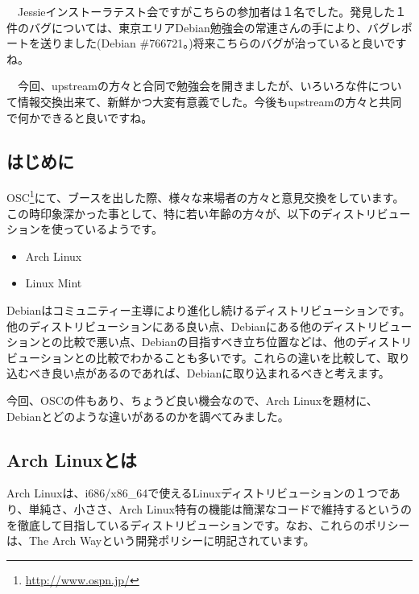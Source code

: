 \documentclass[mingoth,a4paper]{jsarticle}
\begin{document}
　Jessieインストーラテスト会ですがこちらの参加者は１名でした。発見した１件のバグについては、東京エリアDebian勉強会の常連さんの手により、バグレポートを送りました(Debian \#766721。)将来こちらのバグが治っていると良いですね。

　今回、upstreamの方々と合同で勉強会を開きましたが、いろいろな件について情報交換出来て、新鮮かつ大変有意義でした。今後もupstreamの方々と共同で何かできると良いですね。



\subsection{はじめに}

 OSC\footnote{\url{http://www.ospn.jp/}}にて、ブースを出した際、様々な来場者の方々と意見交換をしています。この時印象深かった事として、特に若い年齢の方々が、以下のディストリビューションを使っているようです。

 \begin{itemize}
 \item Arch Linux
 \item Linux Mint
 \end{itemize}
 
 Debianはコミュニティー主導により進化し続けるディストリビューションです。他のディストリビューションにある良い点、Debianにある他のディストリビューションとの比較で悪い点、Debianの目指すべき立ち位置などは、他のディストリビューションとの比較でわかることも多いです。これらの違いを比較して、取り込むべき良い点があるのであれば、Debianに取り込まれるべきと考えます。

 今回、OSCの件もあり、ちょうど良い機会なので、Arch Linuxを題材に、Debianとどのような違いがあるのかを調べてみました。

\subsection{Arch Linuxとは}

 Arch Linuxは、i686/x86\_64で使えるLinuxディストリビューションの１つであり、単純さ、小ささ、Arch Linux特有の機能は簡潔なコードで維持するというのを徹底して目指しているディストリビューションです\cite{ref:arch-linux-desc}。なお、これらのポリシーは、The Arch Way\cite{ref:arch-way}という開発ポリシーに明記されています。
\end{document}
